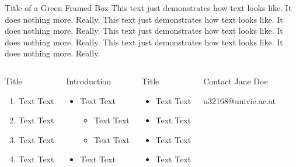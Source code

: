 \documentclass[cd=english,english,portrait]{univie-ling-poster}
\begin{document}
\begin{frame}
\begin{greenframedbox}{Title of a Green Framed Box}
	This text just demonstrates how text looks like. It does nothing more. Really.
	This text just demonstrates how text looks like. It does nothing more. Really.
	This text just demonstrates how text looks like. It does nothing more. Really.
	This text just demonstrates how text looks like. It does nothing more. Really.
\end{greenframedbox}

\begin{columns}[t, totalwidth=\textwidth]


\begin{redbox}{Title}
	\begin{enumerate}
	\item Text Text
	\item Text Text
	\item Text Text
	\item Text Text
	\end{enumerate}
\end{redbox}


\begin{bluebox}{Introduction}
	\begin{itemize}
	\item Text Text
		\begin{itemize}
		\item Text Text
		\item Text Text
		\end{itemize}
	\item Text Text
	\end{itemize}
\end{bluebox}



\begin{bluebox}{Title}
	\begin{itemize}
	\item Text Text
	\item Text Text
	\item Text Text
	\item Text Text
	\end{itemize}
\end{bluebox}

\begin{greenbox}{Contact}
   Jane Doe

   u32168@univie.ac.at
\end{greenbox}

\end{columns}%

\end{frame}%
\end{document}
